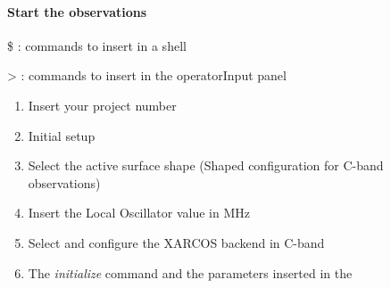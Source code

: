 \documentclass[letterpaper,10pt,english]{sphinxmanual}
\begin{document}
\paragraph{Start the observations}
\label{SpectralLine/C-band/Xarcos/start-obs:start-the-observations}\label{SpectralLine/C-band/Xarcos/start-obs::doc}
\$ : commands to insert in a shell

\textgreater{} : commands to insert in the operatorInput panel
\begin{enumerate}
\item {} 
Insert your project number
\begin{quote}

\end{quote}

\item {} 
Initial setup
\begin{quote}


\end{quote}

\item {} 
Select the active surface shape (Shaped configuration for C-band observations)
\begin{quote}

\end{quote}

\item {} 
Insert the Local Oscillator value in MHz
\begin{quote}

\end{quote}

\item {} 
Select and configure the XARCOS backend in C-band
\begin{quote}


\end{quote}

\item {} 
The \emph{initialize} command and the parameters inserted in the

\end{enumerate}
\end{document}
